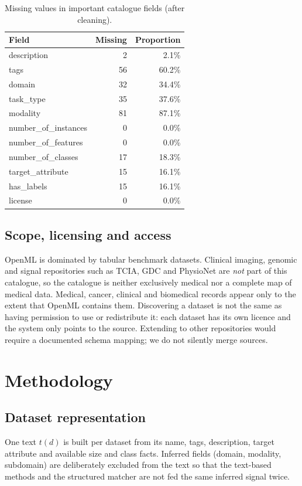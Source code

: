 \documentclass[conference]{IEEEtran}
\begin{document}
\begin{table}[t]
\centering
\caption{Missing values in important catalogue fields (after cleaning).}
\label{tab:missing}
\scriptsize
\begin{tabular}{lrr}
\toprule
Field & Missing & Proportion \\
\midrule
description & 2 & 2.1\% \\
tags & 56 & 60.2\% \\
domain & 32 & 34.4\% \\
task\_type & 35 & 37.6\% \\
modality & 81 & 87.1\% \\
number\_of\_instances & 0 & 0.0\% \\
number\_of\_features & 0 & 0.0\% \\
number\_of\_classes & 17 & 18.3\% \\
target\_attribute & 15 & 16.1\% \\
has\_labels & 15 & 16.1\% \\
license & 0 & 0.0\% \\
\bottomrule
\end{tabular}
\end{table}

\subsection{Scope, licensing and access}
OpenML is dominated by tabular benchmark datasets. Clinical imaging, genomic and signal repositories such as TCIA, GDC and PhysioNet are \emph{not} part of this catalogue, so the catalogue is neither exclusively medical nor a complete map of medical data. Medical, cancer, clinical and biomedical records appear only to the extent that OpenML contains them. Discovering a dataset is not the same as having permission to use or redistribute it: each dataset has its own licence and the system only points to the source. Extending to other repositories would require a documented schema mapping; we do not silently merge sources.

\section{Methodology}
\subsection{Dataset representation}
One text $t(d)$ is built per dataset from its name, tags, description, target attribute and available size and class facts. Inferred fields (domain, modality, subdomain) are deliberately excluded from the text so that the text-based methods and the structured matcher are not fed the same inferred signal twice.
\end{document}
